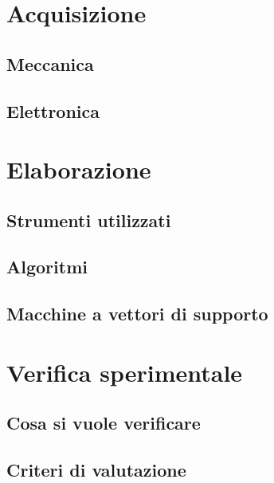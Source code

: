 \documentclass [10pt, a4paper, onecolumn, oneside] {scrreprt}
\numberwithin{endnote}{chapter}
\begin{document}
\chapter{Acquisizione} \label{cap:acquis}
		 \vfill\eject
	\section{Meccanica} \label{sez:meccanica}
		 \vfill
	\section{Elettronica} \label{sez:elettronica}
		 \vfill

\chapter{Elaborazione} \label{cap:elab}
		 \vfill\eject
	\section{Strumenti utilizzati} \label{sez:strumenti}
		 \vfill
	\section{Algoritmi} \label{sez:algoritmi}
		 \vfill
	\section{Macchine a vettori di supporto} \label{sez:svm}
		 \vfill


\chapter{Verifica sperimentale} \label{cap:verifica}
		 \vfill\eject
	\section{Cosa si vuole verificare} \label{sez:cosa}
		 \vfill
	\section{Criteri di valutazione} \label{sez:criteri}
		 \vfill
\end{document}
